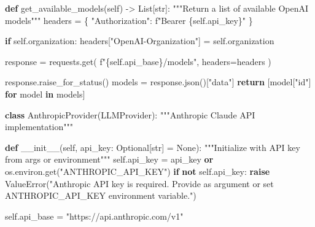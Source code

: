 \documentclass[
  11pt,
  letterpaper,
]{book}
\newenvironment{Shaded}{\begin{snugshade}}{\end{snugshade}}
\newcommand{\BuiltInTok}[1]{\textcolor[rgb]{0.00,0.23,0.31}{#1}}
\newcommand{\CommentTok}[1]{\textcolor[rgb]{0.37,0.37,0.37}{#1}}
\newcommand{\ControlFlowTok}[1]{\textcolor[rgb]{0.00,0.23,0.31}{\textbf{#1}}}
\newcommand{\FunctionTok}[1]{\textcolor[rgb]{0.28,0.35,0.67}{#1}}
\newcommand{\KeywordTok}[1]{\textcolor[rgb]{0.00,0.23,0.31}{\textbf{#1}}}
\newcommand{\NormalTok}[1]{\textcolor[rgb]{0.00,0.23,0.31}{#1}}
\newcommand{\OperatorTok}[1]{\textcolor[rgb]{0.37,0.37,0.37}{#1}}
\newcommand{\PreprocessorTok}[1]{\textcolor[rgb]{0.68,0.00,0.00}{#1}}
\newcommand{\SpecialCharTok}[1]{\textcolor[rgb]{0.37,0.37,0.37}{#1}}
\newcommand{\SpecialStringTok}[1]{\textcolor[rgb]{0.13,0.47,0.30}{#1}}
\newcommand{\StringTok}[1]{\textcolor[rgb]{0.13,0.47,0.30}{#1}}
\newcommand{\VariableTok}[1]{\textcolor[rgb]{0.07,0.07,0.07}{#1}}
\begin{document}
\begin{Shaded}
\begin{Highlighting}[]
    \KeywordTok{def}\NormalTok{ get\_available\_models(}\VariableTok{self}\NormalTok{) }\OperatorTok{{-}\textgreater{}}\NormalTok{ List[}\BuiltInTok{str}\NormalTok{]:}
        \CommentTok{"""Return a list of available OpenAI models"""}
\NormalTok{        headers }\OperatorTok{=}\NormalTok{ \{}
            \StringTok{"Authorization"}\NormalTok{: }\SpecialStringTok{f"Bearer }\SpecialCharTok{\{}\VariableTok{self}\SpecialCharTok{.}\NormalTok{api\_key}\SpecialCharTok{\}}\SpecialStringTok{"}
\NormalTok{        \}}

        \ControlFlowTok{if} \VariableTok{self}\NormalTok{.organization:}
\NormalTok{            headers[}\StringTok{"OpenAI{-}Organization"}\NormalTok{] }\OperatorTok{=} \VariableTok{self}\NormalTok{.organization}

\NormalTok{        response }\OperatorTok{=}\NormalTok{ requests.get(}
            \SpecialStringTok{f"}\SpecialCharTok{\{}\VariableTok{self}\SpecialCharTok{.}\NormalTok{api\_base}\SpecialCharTok{\}}\SpecialStringTok{/models"}\NormalTok{,}
\NormalTok{            headers}\OperatorTok{=}\NormalTok{headers}
\NormalTok{        )}

\NormalTok{        response.raise\_for\_status()}
\NormalTok{        models }\OperatorTok{=}\NormalTok{ response.json()[}\StringTok{"data"}\NormalTok{]}
        \ControlFlowTok{return}\NormalTok{ [model[}\StringTok{"id"}\NormalTok{] }\ControlFlowTok{for}\NormalTok{ model }\KeywordTok{in}\NormalTok{ models]}

\KeywordTok{class}\NormalTok{ AnthropicProvider(LLMProvider):}
    \CommentTok{"""Anthropic Claude API implementation"""}

    \KeywordTok{def} \FunctionTok{\_\_init\_\_}\NormalTok{(}\VariableTok{self}\NormalTok{, api\_key: Optional[}\BuiltInTok{str}\NormalTok{] }\OperatorTok{=} \VariableTok{None}\NormalTok{):}
        \CommentTok{"""Initialize with API key from args or environment"""}
        \VariableTok{self}\NormalTok{.api\_key }\OperatorTok{=}\NormalTok{ api\_key }\KeywordTok{or}\NormalTok{ os.environ.get(}\StringTok{"ANTHROPIC\_API\_KEY"}\NormalTok{)}
        \ControlFlowTok{if} \KeywordTok{not} \VariableTok{self}\NormalTok{.api\_key:}
            \ControlFlowTok{raise} \PreprocessorTok{ValueError}\NormalTok{(}\StringTok{"Anthropic API key is required. Provide as argument or set ANTHROPIC\_API\_KEY environment variable."}\NormalTok{)}

        \VariableTok{self}\NormalTok{.api\_base }\OperatorTok{=} \StringTok{"https://api.anthropic.com/v1"}


\end{Highlighting}
\end{Shaded}
\end{document}
